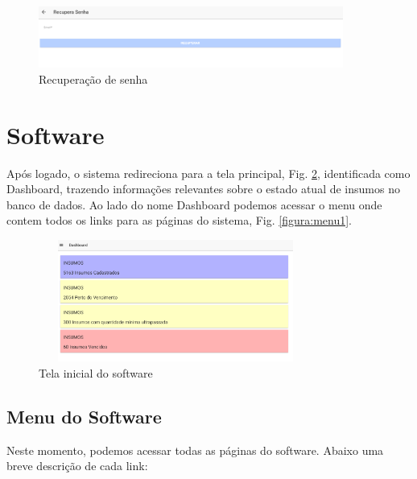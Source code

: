 \documentclass[letterpaper, 12 pt]{article}
\begin{document}
\begin{figure}[h]
\centering %
\includegraphics[width=10cm]{imagens/recuperar1.PNG}
\caption{Recuperação de senha}
\label{figura:recuperar1}
\end{figure}
\newpage

\section{Software}
Após logado, o sistema redireciona para a tela principal, Fig. \ref{figura:dashboard1}, identificada como Dashboard, trazendo informações relevantes sobre o estado atual de insumos no banco de dados. Ao lado do nome Dashboard podemos acessar o menu onde contem todos os links para as páginas do sistema, Fig. \ref{figura:menu1}.

\begin{figure}[h]
\centering %
\includegraphics[width=9cm, height=4cm]{imagens/dashboard1.PNG} 
\caption{Tela inicial do software}
\label{figura:dashboard1}
\end{figure}

\subsection{Menu do Software}
Neste momento, podemos acessar todas as páginas do software. Abaixo uma breve descrição de cada link:
\end{document}
